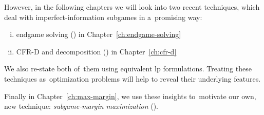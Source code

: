 However, in the following chapters we will look into two recent techniques, which deal with imperfect-information subgames in a~promising way:
\begin{enumerate}[(i)]
  \item endgame solving (\cite{Ganzfried2015endgame}) in Chapter~\ref{ch:endgame-solving}
  \item CFR-D and decomposition (\cite{BurchJohansonBowling13}) in Chapter~\ref{ch:cfr-d}
\end{enumerate}
We also re-state both of~them using equivalent \acrshort{lp} formulations.
Treating these techniques as~optimization problems will help to reveal their underlying features.

Finally in Chapter~\ref{ch:max-margin}, we use these insights to~motivate our own, new technique: \emph{subgame-margin maximization} (\cite{Moravcik2016refining}).
